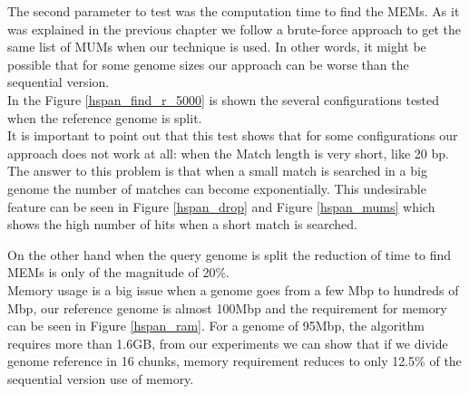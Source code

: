\documentclass[10pt]{bmc_article}
\newenvironment{bmcformat}{\begin{raggedright}\baselineskip20pt\sloppy\setboolean{publ}{false}}{\end{raggedright}\baselineskip20pt\sloppy}
\begin{document}
\begin{bmcformat}
\begin{figure}[htb] 
\centering
{}
\hspace{0.1cm}
\end{figure}
The second parameter to test was the computation time to find the MEMs. As it was explained in the previous chapter we follow a brute-force approach to get the same list of MUMs when our technique is used. In other words, it might be possible that for some genome sizes our approach can be worse than the sequential version.\\
In the Figure \ref{hspan_find_r_5000} is shown the several configurations tested when the reference genome is split. \\
It is important to point out that this test shows that for some configurations our approach does not work at all: when the Match length is very short, like 20 bp. The answer to this problem is that when a small match is searched in a big genome the number of matches can become exponentially. This undesirable feature can be seen in Figure \ref{hspan_drop} and Figure \ref{hspan_mums} which shows the high number of hits when a short match is searched.\\
\begin{figure}[htb] 
\centering
{}
\hspace{0.1cm}
\end{figure}
On the other hand when the query genome is split the reduction of time to find MEMs is only of the magnitude of 20\%.\\
Memory usage is a big issue when a genome goes from a few Mbp to hundreds of Mbp, our reference genome is almost 100Mbp and the requirement for memory can be seen in Figure \ref{hspan_ram}. For a genome of 95Mbp, the algorithm requires more than 1.6GB, from our experiments we can show that if we divide genome reference in 16 chunks, memory requirement reduces to only 12.5\% of the sequential version use of memory.\\
\begin{figure}[htb] 
\begin{center}

\end{center}
\end{figure}
\end{bmcformat}
\end{document}
